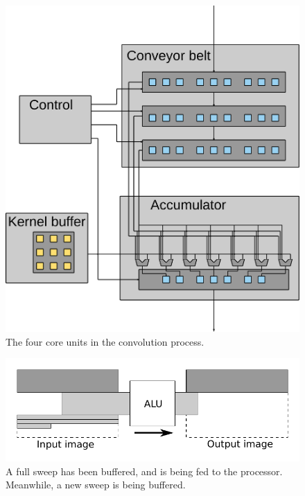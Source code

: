\begin{figure}[h!]
    \includegraphics[width=\linewidth]{img/processor_overview_small.png}
    \caption{The four core units in the convolution process.}
    \label{fig:processor_core}
\end{figure}

\begin{figure}[h!]
    \includegraphics[width=\linewidth]{img/daisy_processing.pdf}
    \caption[Buffering and feeding of sweeps.]{A full sweep has been buffered, and is being fed to the processor. Meanwhile, a new sweep is being buffered.}
    \label{fig:sweep_feed}
\end{figure}

